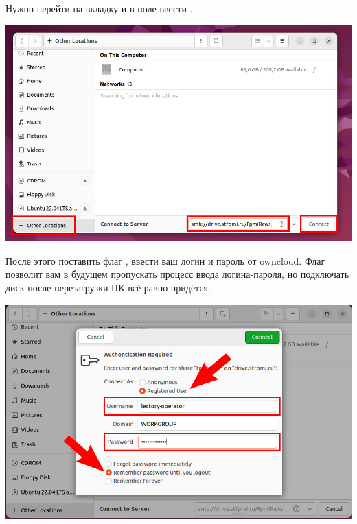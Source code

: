Нужно перейти на вкладку  и в поле  ввести .

\begin{center}
  \begin{minipage}[c]{\textwidth - \fboxaddlen}
    \centering
    \includegraphics[width={\textwidth - \fboxaddlen},fbox]{Images/CloudStorage/ubuntu/nautilus/other-locations.jpg}
  \end{minipage}
\end{center}

После этого поставить флаг , ввести ваш логин и пароль от owncloud. Флаг  позволит вам в будущем пропускать процесс ввода логина-пароля, но подключать диск после перезагрузки ПК всё равно придётся.

\begin{center}
  \begin{minipage}[c]{\textwidth - \fboxaddlen}
    \centering
    \includegraphics[width={\textwidth - \fboxaddlen},fbox]{Images/CloudStorage/ubuntu/nautilus/auth.jpg}
  \end{minipage}
\end{center}


